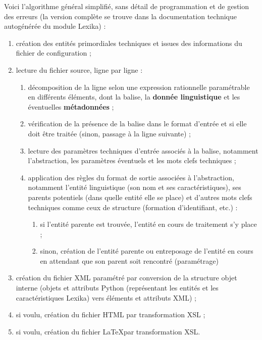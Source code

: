 \documentclass[10pt]{report}
\newcommand{\balise}[1]{\textcolor{red!80}{#1}}
\newcommand{\entité}[1]{\textcolor{blue!80!black}{#1}}
\newcommand{\caractéristique}[1]{\textcolor{green!60!black}{#1}}
\newcommand{\abstraction}[1]{\textcolor{blue!50!red}{#1}}
\begin{document}
Voici l’algorithme général simplifié, sans détail de programmation et de gestion des erreurs (la version complète se trouve dans la documentation technique autogénérée du module Lexika) :
\begin{enumerate}
	\item création des entités primordiales techniques et issues des informations du fichier de configuration ;
	\item lecture du fichier source, ligne par ligne :
	\begin{enumerate}
    \item décomposition de la ligne selon une expression rationnelle paramétrable en différents éléments, dont la \balise{balise}, la \textbf{donnée linguistique} et les éventuelles \textbf{métadonnées} ;
    \item vérification de la présence de la \balise{balise} dans le format d’entrée et si elle doit être traitée (sinon, passage à la ligne suivante) ;
    \item lecture des paramètres techniques d’entrée associés à la \balise{balise}, notamment l’\abstraction{abstraction}, les paramètres éventuels et les mots clefs techniques ;
    \item application des règles du format de sortie associées à l’\abstraction{abstraction}, notamment l’\entité{entité linguistique} (son nom et ses \caractéristique{caractéristiques}), ses \entité{parents potentiels} (dans quelle \entité{entité} elle se place) et d’autres mots clefs techniques comme ceux de structure (formation d’identifiant, etc.) :
    \begin{enumerate}
    	\item si l’\entité{entité parente} est trouvée, l’\entité{entité en cours de traitement} s’y place ;
    	\item sinon, création de l’\entité{entité parente} ou entreposage de l’\entité{entité en cours} en attendant que son \entité{parent} soit rencontré (paramétrage)
    \end{enumerate}
	\end{enumerate}
	\item création du fichier XML paramétré par conversion de la structure objet interne (objets et attributs Python (représentant les \entité{entités} et les \caractéristique{caractéristiques} Lexika) vers éléments et attributs XML) ;
	\item si voulu, création du fichier HTML par transformation XSL ;
	\item si voulu, création du fichier \LaTeX par transformation XSL.
\end{enumerate}
\end{document}
